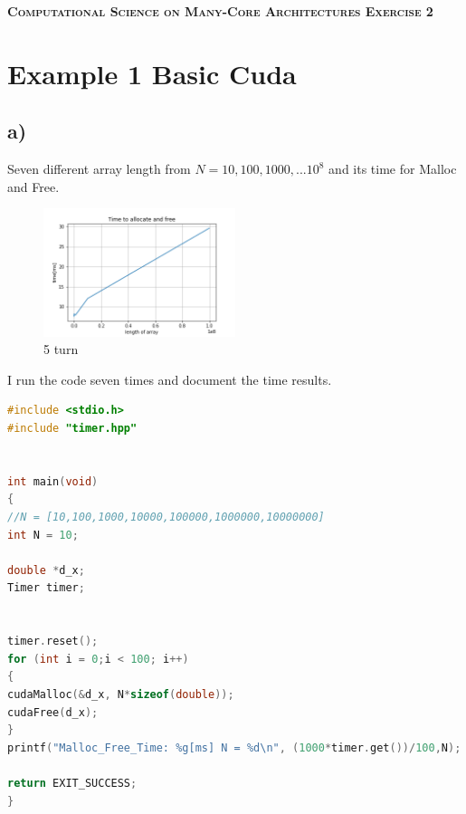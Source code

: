 \documentclass[11pt,a4paper]{article}
\begin{document}
\begin{center}
	\fontsize{24pt}{10pt}\selectfont
	\textsc{\textbf{Computational Science on Many-Core Architectures  Exercise 2}}
\end{center}
\section*{Example 1 Basic Cuda}
\subsection*{a)}
Seven different array length from $N = 10,100,1000,...10^8$ and its time for Malloc and Free.
\begin{figure}[H]
	\centering
	\includegraphics[width=0.50\textwidth]{Bilder/Time_to_allocate_and_free.png}
	\caption{5 turn}
\end{figure}
I run the code seven times and document the time results.
\begin{lstlisting}[language=C++, caption={code for a)}]
#include <stdio.h>
#include "timer.hpp"


int main(void)
{
//N = [10,100,1000,10000,100000,1000000,10000000]
int N = 10;

double *d_x;
Timer timer;


timer.reset();
for (int i = 0;i < 100; i++)
{
cudaMalloc(&d_x, N*sizeof(double));
cudaFree(d_x);
}
printf("Malloc_Free_Time: %g[ms] N = %d\n", (1000*timer.get())/100,N);

return EXIT_SUCCESS;
}
\end{lstlisting}
\end{document}
